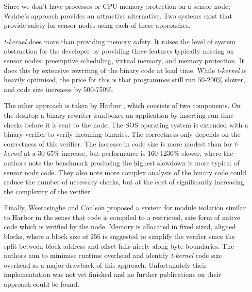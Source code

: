 Since we don't have processes or CPU memory protection on a sensor node, Wahbe's approach provides an attractive alternative. Two systems exist that provide safety for sensor nodes using each of these approaches.

\emph{t-kernel} does more than providing memory safety. It raises the level of system abstraction for the developer by providing three features typically missing on sensor nodes: preemptive scheduling, virtual memory, and memory protection. It does this by extensive rewriting of the binary code at load time. While \emph{t-kernel} is heavily optimised, the price for this is that programmes still run 50-200\% slower, and code size increases by 500-750\%.

The other approach is taken by Harbor \cite{Kumar:2007ge}, which consists of two components. On the desktop a binary rewriter sandboxes an application by inserting run-time checks before it is sent to the node. The SOS operating system \cite{Han:2005th} is extended with a binary verifier to verify incoming binaries. The correctness only depends on the correctness of this verifier. The increase in code size is more modest than for \emph{t-kernel} at a 30-65\% increase, but performance is 160-1230\% slower, where the authors note the benchmark producing the highest slowdown is more typical of sensor node code. They also note more complex analysis of the binary code could reduce the number of necessary checks, but at the cost of significantly increasing the complexity of the verifier.

Finally, Weerasinghe and Coulson \cite{Weerasinghe:2008kh} proposed a system for module isolation similar to Harbor in the sense that code is compiled to a restricted, safe form of native code which is verified by the node. Memory is allocated in fixed sized, aligned blocks, where a block size of 256 is suggested to simplify the verifier since the split between block address and offset falls nicely along byte boundaries. The authors aim to minimise runtime overhead and identify \emph{t-kernel} code size overhead as a major drawback of this approach. Unfortunately their implementation was not yet finished and no further publications on their approach could be found.
